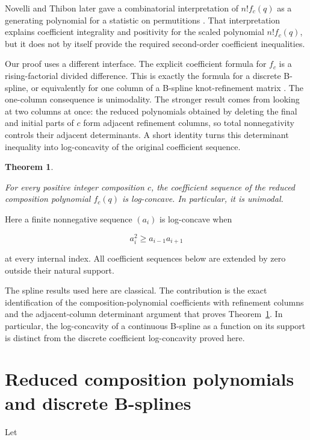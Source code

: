 \documentclass[11pt]{article}
\newtheorem{theorem}{Theorem}[section]
\begin{document}
Novelli and Thibon later gave a combinatorial interpretation of $n!f_c(q)$ as a generating
polynomial for a statistic on permutitions \cite{novelli-thibon}. That interpretation explains coefficient
integrality and positivity for the scaled polynomial $n!f_c(q)$, but it does not by itself provide
the required second-order coefficient inequalities.

Our proof uses a different interface. The explicit coefficient formula for $f_c$ is a
rising-factorial divided difference. This is exactly the formula for a discrete B-spline, or
equivalently for one column of a B-spline knot-refinement matrix \cite{cohen-lyche-riesenfeld}. The one-column consequence is
unimodality. The stronger result comes from looking at two columns at once: the reduced polynomials
obtained by deleting the final and initial parts of $c$ form adjacent refinement columns, so total
nonnegativity controls their adjacent determinants. A short identity turns this determinant
inequality into log-concavity of the original coefficient sequence.

\Needspace{0.18\textheight}
\begin{theorem}
\label{thm:main}

For every positive integer composition $c$, the coefficient sequence of the reduced composition
polynomial $f_c(q)$ is log-concave. In particular, it is unimodal.

\end{theorem}

Here a finite nonnegative sequence $(a_i)$ is log-concave when

\[
a_i^2\geq a_{i-1}a_{i+1}
\]

at every internal index. All coefficient sequences below are extended by zero outside their natural
support.

The spline results used here are classical. The contribution is the exact identification of the
composition-polynomial coefficients with refinement columns and the adjacent-column determinant
argument that proves Theorem~\ref{thm:main}. In particular, the log-concavity of a continuous B-spline as a
function on its support \cite{floater} is distinct from the discrete coefficient log-concavity proved here.

\section{Reduced composition polynomials and discrete B-splines}


Let
\end{document}
